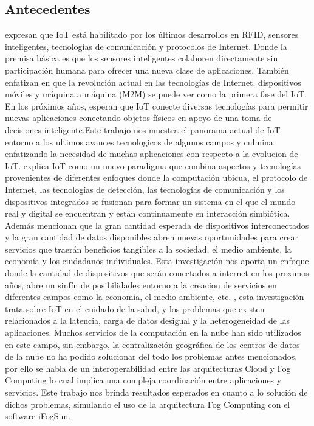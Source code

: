     \subsection{Antecedentes}
        \vskip 0.3cm
        {\cite{alfuqaha2015}} expresan que IoT está habilitado por los últimos desarrollos en RFID, sensores inteligentes, tecnologías de comunicación y protocolos de Internet. Donde la premisa básica es que los sensores inteligentes colaboren directamente sin participación humana para ofrecer una nueva clase de aplicaciones. También enfatizan en que la revolución actual en las tecnologías de Internet, dispositivos móviles y máquina a máquina (M2M) se puede ver como la primera fase del IoT. En los próximos años,  esperan que IoT conecte diversas tecnologías para permitir nuevas aplicaciones conectando objetos físicos en apoyo de una toma de decisiones inteligente.Este trabajo nos muestra el panorama actual de IoT entorno a los ultimos avances tecnologicos de algunos campos y culmina enfatizando la necesidad de muchas aplicaciones con respecto a la evolucion de IoT.
        \vskip 0.3cm
        {\cite{borgia2014}} explica IoT como un nuevo paradigma que combina aspectos y tecnologías provenientes de diferentes enfoques donde la computación ubicua, el protocolo de Internet, las tecnologías de detección, las tecnologías de comunicación y los dispositivos integrados se fusionan para formar un sistema en el que el mundo real y digital se encuentran y están continuamente en interacción simbiótica. Además mencionan que la gran cantidad esperada de dispositivos interconectados y la gran cantidad de datos disponibles abren nuevas oportunidades para crear servicios que traerán beneficios tangibles a la sociedad, el medio ambiente, la economía y los ciudadanos individuales.      Esta investigación nos aporta un enfoque donde la cantidad de dispositivos que serán conectados a internet en los proximos años, abre un sinfín de posibilidades entorno a la creacion de servicios en diferentes campos como la economía, el medio ambiente, etc.
        \vskip 0.3cm
        {\cite{mahumd2018}}, esta investigación trata sobre IoT en el cuidado de la salud, y los problemas que existen relacionados a la latencia, carga de datos desigual y la heterogeneidad de las aplicaciones. Muchos servicios de la computación en la nube han sido utilizados en este campo, sin embargo, la centralización geográfica de los centros de datos de la nube no ha podido solucionar del todo los problemas antes mencionados, por ello se habla de un interoperabilidad entre las arquitecturas Cloud y Fog Computing lo cual implica una compleja coordinación entre aplicaciones y servicios. Este trabajo nos brinda resultados esperados en cuanto a lo solución de dichos problemas, simulando el uso de la arquitectura Fog Computing con el software iFogSim.\par
